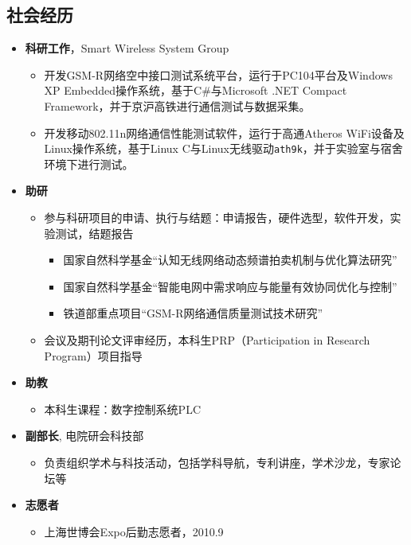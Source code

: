 \begin{CJK}{UTF8}{hei}
\section{社会经历}
\begin{itemize}
\item \textbf{科研工作}，Smart Wireless System Group
  \begin{itemize}
    \item 开发GSM-R网络空中接口测试系统平台，运行于PC104平台及Windows XP Embedded操作系统，基于C\#与Microsoft .NET Compact Framework，并于京沪高铁进行通信测试与数据采集。
    \item 开发移动802.11n网络通信性能测试软件，运行于高通Atheros WiFi设备及Linux操作系统，基于Linux C与Linux无线驱动\texttt{ath9k}，并于实验室与宿舍环境下进行测试。
  \end{itemize}
\item \textbf{助研}
  \begin{itemize}
    \item 参与科研项目的申请、执行与结题：申请报告，硬件选型，软件开发，实验测试，结题报告
    \begin{itemize}
      \item 国家自然科学基金“认知无线网络动态频谱拍卖机制与优化算法研究”
      \item 国家自然科学基金“智能电网中需求响应与能量有效协同优化与控制”
      \item 铁道部重点项目“GSM-R网络通信质量测试技术研究”
    \end{itemize}
    \item 会议及期刊论文评审经历，本科生PRP（Participation in Research Program）项目指导
  \end{itemize}
\item \textbf{助教}
  \begin{itemize}
      \item 本科生课程：数字控制系统PLC
  \end{itemize}
\item \textbf{副部长}, 电院研会科技部
  \begin{itemize}
    \item 负责组织学术与科技活动，包括学科导航，专利讲座，学术沙龙，专家论坛等
  \end{itemize}
\item \textbf{志愿者}
  \begin{itemize}
  \item 上海世博会Expo后勤志愿者，2010.9

\end{itemize}
\end{itemize}
\end{CJK}
